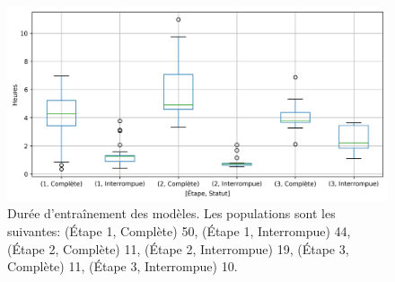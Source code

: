 \begin{figure}[ht]
    \centering
    \includegraphics[width=\textwidth]{figures/chap3/entrainement/TrainingDuration96BoxPlot.png}
    \caption{Durée d'entraînement des modèles. Les populations sont les suivantes: (Étape 1, Complète) 50, (Étape 1, Interrompue) 44, (Étape 2, Complète) 11, (Étape 2, Interrompue) 19, (Étape 3, Complète) 11, (Étape 3, Interrompue) 10.}
    \label{fig:lemmatisationTrainingTime}
\end{figure}

